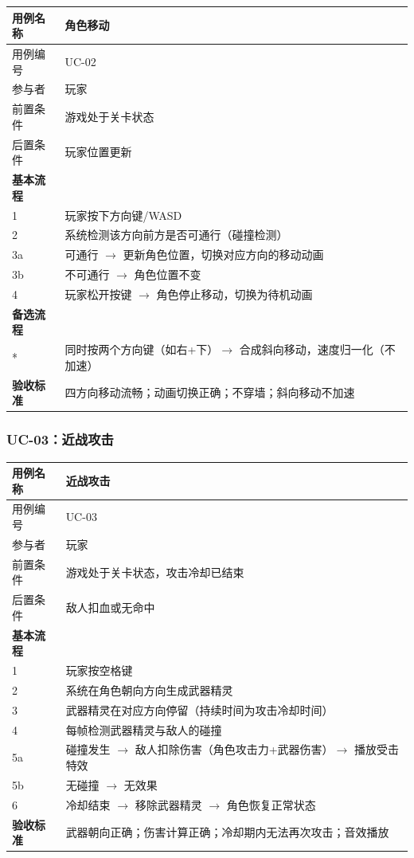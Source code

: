 \documentclass[12pt,a4paper]{article}
\begin{document}
\begin{table}[htbp]
\centering
\begin{tabularx}{\textwidth}{lX}
\toprule
\textbf{用例名称} & 角色移动 \\
\midrule
用例编号 & UC-02 \\
参与者 & 玩家 \\
前置条件 & 游戏处于关卡状态 \\
后置条件 & 玩家位置更新 \\
\midrule
\textbf{基本流程} & \\
1 & 玩家按下方向键/WASD \\
2 & 系统检测该方向前方是否可通行（碰撞检测） \\
3a & 可通行 $\rightarrow$ 更新角色位置，切换对应方向的移动动画 \\
3b & 不可通行 $\rightarrow$ 角色位置不变 \\
4 & 玩家松开按键 $\rightarrow$ 角色停止移动，切换为待机动画 \\
\midrule
\textbf{备选流程} & \\
* & 同时按两个方向键（如右+下）$\rightarrow$ 合成斜向移动，速度归一化（不加速） \\
\midrule
\textbf{验收标准} & 四方向移动流畅；动画切换正确；不穿墙；斜向移动不加速 \\
\bottomrule
\end{tabularx}
\end{table}

\subsubsection{UC-03：近战攻击}

\begin{table}[htbp]
\centering
\begin{tabularx}{\textwidth}{lX}
\toprule
\textbf{用例名称} & 近战攻击 \\
\midrule
用例编号 & UC-03 \\
参与者 & 玩家 \\
前置条件 & 游戏处于关卡状态，攻击冷却已结束 \\
后置条件 & 敌人扣血或无命中 \\
\midrule
\textbf{基本流程} & \\
1 & 玩家按空格键 \\
2 & 系统在角色朝向方向生成武器精灵 \\
3 & 武器精灵在对应方向停留（持续时间为攻击冷却时间） \\
4 & 每帧检测武器精灵与敌人的碰撞 \\
5a & 碰撞发生 $\rightarrow$ 敌人扣除伤害（角色攻击力+武器伤害）$\rightarrow$ 播放受击特效 \\
5b & 无碰撞 $\rightarrow$ 无效果 \\
6 & 冷却结束 $\rightarrow$ 移除武器精灵 $\rightarrow$ 角色恢复正常状态 \\
\midrule
\textbf{验收标准} & 武器朝向正确；伤害计算正确；冷却期内无法再次攻击；音效播放 \\
\bottomrule
\end{tabularx}
\end{table}
\end{document}
